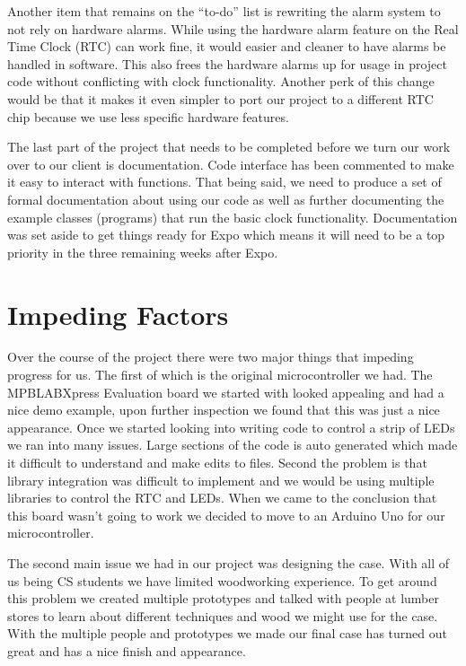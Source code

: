 \documentclass[onecolumn, draftclsnofoot,10pt, compsoc]{IEEEtran}
\begin{document}
Another item that remains on the “to-do” list is rewriting the alarm system to not rely on hardware alarms.
While using the hardware alarm feature on the Real Time Clock (RTC) can work fine, it would easier and cleaner to have alarms be handled in software.
This also frees the hardware alarms up for usage in project code without conflicting with clock functionality.
Another perk of this change would be that it makes it even simpler to port our project to a different RTC chip because we use less specific hardware features.

The last part of the project that needs to be completed before we turn our work over to our client is documentation.
Code interface has been commented to make it easy to interact with functions.
That being said, we need to produce a set of formal documentation about using our code as well as further documenting the example classes (programs) that run the basic clock functionality.
Documentation was set aside to get things ready for Expo which means it will need to be a top priority in the three remaining weeks after Expo.

\section{Impeding Factors}
Over the course of the project there were two major things that impeding progress for us.
The first of which is the original microcontroller we had.
The MPBLABXpress Evaluation board we started with looked appealing and had a nice demo example, upon further inspection we found that this was just a nice appearance.
Once we started looking into writing code to control a strip of LEDs we ran into many issues.
Large sections of the code is auto generated which made it difficult to understand and make edits to files.
Second the problem is that library integration was difficult to implement and we would be using multiple libraries to control the RTC and LEDs.
When we came to the conclusion that this board wasn’t going to work we decided to move to an Arduino Uno for our microcontroller.

The second main issue we had in our project was designing the case.
With all of us being CS students we have limited woodworking experience.
To get around this problem we created multiple prototypes and talked with people at lumber stores to learn about different techniques and wood we might use for the case.
With the multiple people and prototypes we made our final case has turned out great and has a nice finish and appearance.
\end{document}
